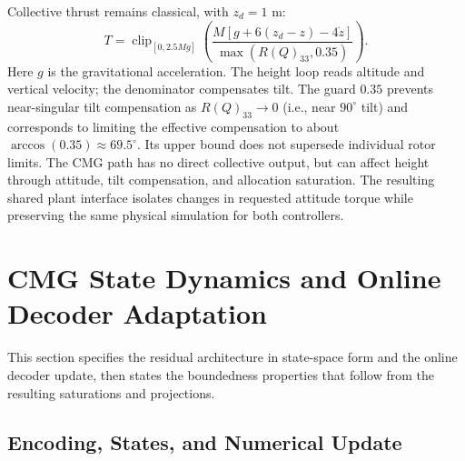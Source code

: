 \documentclass[letterpaper, 10 pt, conference]{ieeeconf}
\newcommand{\clip}{\operatorname{clip}}
\begin{document}
Collective thrust remains classical, with $z_d=1$ m:
\begin{equation}
 T=\clip_{[0,2.5Mg]}
 \left(\frac{M[g+6(z_d-z)-4\dot z]}{\max(R(Q)_{33},0.35)}\right).
 \label{eq:collective}
\end{equation}
Here $g$ is the gravitational acceleration. The height loop reads altitude and vertical velocity; the denominator compensates tilt.
The guard $0.35$ prevents near-singular tilt compensation as $R(Q)_{33}\to0$
(i.e., near $90^\circ$ tilt) and corresponds to limiting the effective
compensation to about $\arccos(0.35)\approx69.5^\circ$. Its upper bound does
not supersede individual rotor limits. The CMG path has no direct collective
output, but can affect height through attitude, tilt compensation, and
allocation saturation.
The resulting shared plant interface isolates changes in requested
attitude torque while preserving the same physical simulation for both
controllers.

\section{CMG State Dynamics and Online Decoder Adaptation}
\label{sec:architecture}
\label{sec:analysis}
This section specifies the residual architecture in state-space form and the online decoder update, then states the boundedness properties that follow from the resulting saturations and projections.
\subsection{Encoding, States, and Numerical Update}
\end{document}
